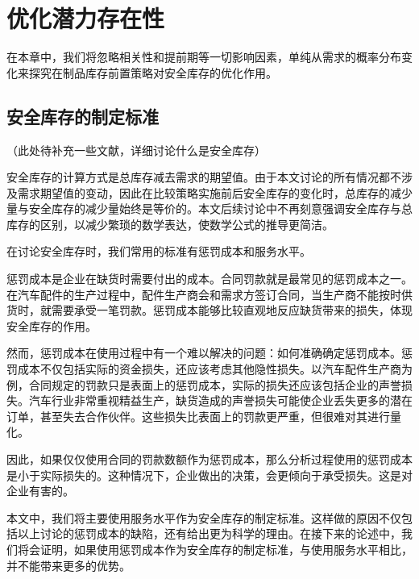 
\chapter{优化潜力存在性}
\label{chapter:优化潜力}

在本章中，我们将忽略相关性和提前期等一切影响因素，单纯从需求的概率分布变化来探究在制品库存前置策略对安全库存的优化作用。






\section{安全库存的制定标准}

（此处待补充一些文献，详细讨论什么是安全库存）

安全库存的计算方式是总库存减去需求的期望值。由于本文讨论的所有情况都不涉及需求期望值的变动，因此在比较策略实施前后安全库存的变化时，总库存的减少量与安全库存的减少量始终是等价的。本文后续讨论中不再刻意强调安全库存与总库存的区别，以减少繁琐的数学表达，使数学公式的推导更简洁。

在讨论安全库存时，我们常用的标准有惩罚成本和服务水平。

惩罚成本是企业在缺货时需要付出的成本。合同罚款就是最常见的惩罚成本之一。在汽车配件的生产过程中，配件生产商会和需求方签订合同，当生产商不能按时供货时，就需要承受一笔罚款。惩罚成本能够比较直观地反应缺货带来的损失，体现安全库存的作用。

然而，惩罚成本在使用过程中有一个难以解决的问题：如何准确确定惩罚成本。惩罚成本不仅包括实际的资金损失，还应该考虑其他隐性损失。以汽车配件生产商为例，合同规定的罚款只是表面上的惩罚成本，实际的损失还应该包括企业的声誉损失。汽车行业非常重视精益生产，缺货造成的声誉损失可能使企业丢失更多的潜在订单，甚至失去合作伙伴。这些损失比表面上的罚款更严重，但很难对其进行量化。

因此，如果仅仅使用合同的罚款数额作为惩罚成本，那么分析过程使用的惩罚成本是小于实际损失的。这种情况下，企业做出的决策，会更倾向于承受损失。这是对企业有害的。

本文中，我们将主要使用服务水平作为安全库存的制定标准。这样做的原因不仅包括以上讨论的惩罚成本的缺陷，还有给出更为科学的理由。在接下来的论述中，我们将会证明，如果使用惩罚成本作为安全库存的制定标准，与使用服务水平相比，并不能带来更多的优势。

